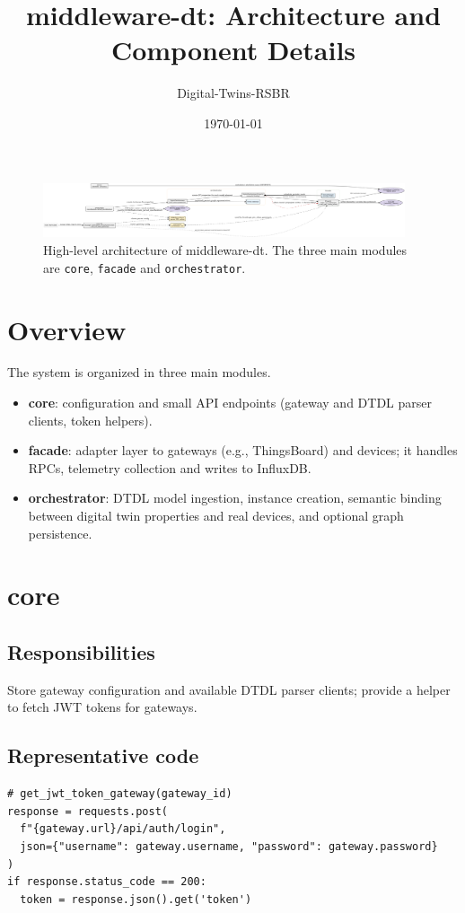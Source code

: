\documentclass[11pt]{article}
\title{middleware-dt: Architecture and Component Details}
\author{Digital-Twins-RSBR}
\date{\today}
\begin{document}
\maketitle

\begin{figure}[ht]
  \centering
  \includegraphics[width=0.95\textwidth]{docs/architecture_diagram.png}
  \caption{High-level architecture of middleware-dt. The three main modules are \texttt{core}, \texttt{facade} and \texttt{orchestrator}.}
\end{figure}

\section{Overview}
The system is organized in three main modules.
\begin{itemize}
  \item \textbf{core}: configuration and small API endpoints (gateway and DTDL parser clients, token helpers).
  \item \textbf{facade}: adapter layer to gateways (e.g., ThingsBoard) and devices; it handles RPCs, telemetry collection and writes to InfluxDB.
  \item \textbf{orchestrator}: DTDL model ingestion, instance creation, semantic binding between digital twin properties and real devices, and optional graph persistence.
\end{itemize}

\section{core}
\subsection*{Responsibilities}
Store gateway configuration and available DTDL parser clients; provide a helper to fetch JWT tokens for gateways.

\subsection*{Representative code}
\begin{lstlisting}
# get_jwt_token_gateway(gateway_id)
response = requests.post(
  f"{gateway.url}/api/auth/login",
  json={"username": gateway.username, "password": gateway.password}
)
if response.status_code == 200:
  token = response.json().get('token')
\end{lstlisting}
\end{document}

